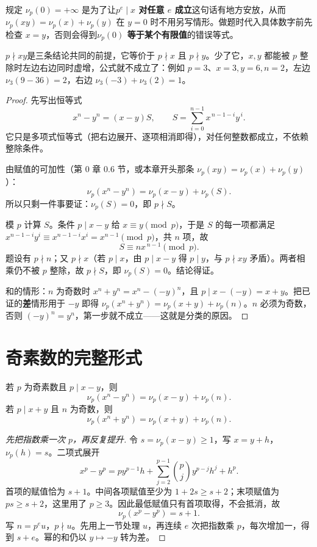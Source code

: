 \begin{tip}[口径：为什么规定 $\nu_p(0)=+\infty$]
规定 $\nu_p(0)=+\infty$ 是为了让\textbf{$p^e\mid x$ 对任意 $e$ 成立}这句话有地方安放，从而 $\nu_p(xy)=\nu_p(x)+\nu_p(y)$ 在 $y=0$ 时不用另写情形。做题时代入具体数字前先检查 $x=y$，否则会得到\textbf{$\nu_p(0)$ 等于某个有限值}的错误等式。
\end{tip}


\begin{tip}
\textbf{$p\nmid xy$}是三条结论共同的前提，它等价于 $p\nmid x$ 且 $p\nmid y$。少了它，$x,y$ 都能被 $p$ 整除时左边右边同时虚增，公式就不成立了：例如 $p=3$、$x=3,y=6,n=2$，左边 $\nu_3(9-36)=2$，右边 $\nu_3(-3)+\nu_3(2)=1$。
\end{tip}

\begin{proof}
先写出恒等式
\[
 x^n-y^n=(x-y)S,\qquad S=\sum_{i=0}^{n-1}x^{\,n-1-i}y^{\,i}.
\]
它只是多项式恒等式（把右边展开、逐项相消即得），对任何整数都成立，不依赖整除条件。

由赋值的可加性（第 0 章 0.6 节，或本章开头那条 $\nu_p(xy)=\nu_p(x)+\nu_p(y)$）：
\[
 \nu_p(x^n-y^n)=\nu_p(x-y)+\nu_p(S).
\]
所以只剩一件事要证：$\nu_p(S)=0$，即 $p\nmid S$。

模 $p$ 计算 $S$。条件 $p\mid x-y$ 给 $x\equiv y\pmod p$，于是 $S$ 的每一项都满足 $x^{n-1-i}y^{i}\equiv x^{n-1-i}x^{i}=x^{n-1}\pmod p$，共 $n$ 项，故
\[
 S\equiv n x^{\,n-1}\pmod p.
\]
题设有 $p\nmid n$；又 $p\nmid x$（若 $p\mid x$，由 $p\mid x-y$ 得 $p\mid y$，与 $p\nmid xy$ 矛盾）。两者相乘仍不被 $p$ 整除，故 $p\nmid S$，即 $\nu_p(S)=0$。结论得证。

和的情形：$n$ 为奇数时 $x^n+y^n=x^n-(-y)^n$，且 $p\mid x-(-y)=x+y$。把已证的\textbf{差}情形用于 $-y$ 即得
$\nu_p(x^n+y^n)=\nu_p(x+y)+\nu_p(n)$。$n$ 必须为奇数，否则 $(-y)^n=y^n$，第一步就不成立——这就是分类的原因。
\end{proof}

\section{奇素数的完整形式}
\begin{theorem}
若 $p$ 为奇素数且 $p\mid x-y$，则
\[
 \nu_p(x^n-y^n)=\nu_p(x-y)+\nu_p(n).
\]
若 $p\mid x+y$ 且 $n$ 为奇数，则
\[
 \nu_p(x^n+y^n)=\nu_p(x+y)+\nu_p(n).
\]
\end{theorem}

\begin{proof}[先把指数乘一次 $p$，再反复提升]
令 $s=\nu_p(x-y)\ge1$，写 $x=y+h$，$\nu_p(h)=s$。二项式展开
\[
 x^p-y^p=py^{p-1}h+\sum_{j=2}^{p-1}\binom pj y^{p-j}h^j+h^p.
\]
首项的赋值恰为 $s+1$。中间各项赋值至少为 $1+2s\ge s+2$；末项赋值为 $ps\ge s+2$，这里用了 $p\ge3$。因此最低赋值只有首项取得，不会抵消，故
\[
\nu_p(x^p-y^p)=s+1.
\]
写 $n=p^e u$，$p\nmid u$。先用上一节处理 $u$，再连续 $e$ 次把指数乘 $p$，每次增加一，得到 $s+e$。幂的和仍以 $y\mapsto-y$ 转为差。
\end{proof}
